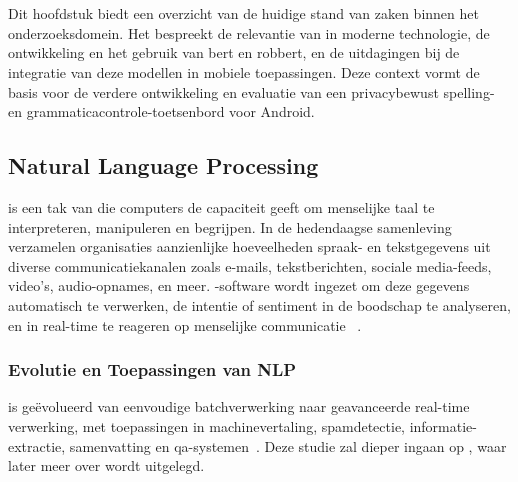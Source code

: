 \chapter{}%
\label{ch:stand-van-zaken}



Dit hoofdstuk biedt een overzicht van de huidige stand van zaken binnen het onderzoeksdomein. Het bespreekt de relevantie van  in moderne technologie, de ontwikkeling en het gebruik van \gls{bert} en \gls{robbert}, en de uitdagingen bij de integratie van deze modellen in mobiele toepassingen. Deze context vormt de basis voor de verdere ontwikkeling en evaluatie van een privacybewust spelling- en grammaticacontrole-toetsenbord voor Android.

\section{Natural Language Processing}

 is een tak van  die computers de capaciteit geeft om menselijke taal te interpreteren, manipuleren en begrijpen. In de hedendaagse samenleving verzamelen organisaties aanzienlijke hoeveelheden spraak- en tekstgegevens uit diverse communicatiekanalen zoals e-mails, tekstberichten, sociale media-feeds, video's, audio-op\-na\-mes, en meer. -software wordt ingezet om deze gegevens automatisch te verwerken, de intentie of sentiment in de boodschap te analyseren, en in real-time te reageren op menselijke communicatie ~\autocite{AWSI2023}. 

\subsection{Evolutie en Toepassingen van NLP}

 is geëvolueerd van eenvoudige batchverwerking naar geavanceerde real-time verwerking, met toepassingen in machinevertaling, spamdetectie, informatie-ex\-tractie, samenvatting en \gls{qa}-systemen~\autocite{Cambria2014, Khurana2017}. Deze studie zal dieper ingaan op , waar later meer over wordt uitgelegd.

